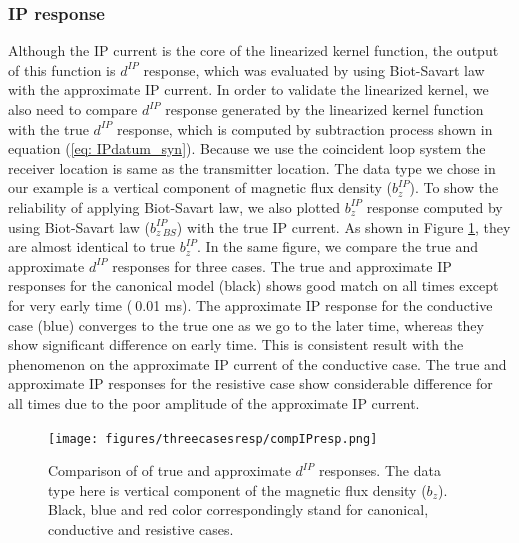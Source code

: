 \documentclass[a4paper, 11pt]{article}
\newcommand{\dip}{d^{IP}}
\begin{document}
\subsubsection{IP response}
Although the IP current is the core of the linearized kernel function, the output of this function is $\dip$ response, which was evaluated by using Biot-Savart law with the approximate IP current. In order to validate the linearized kernel, we also need to compare $\dip$ response generated by the linearized kernel function with the true $\dip$ response, which is computed by subtraction process shown in equation (\ref{eq: IPdatum_syn}). Because we use the coincident loop system the receiver location is same as the transmitter location. The data type we chose in our example is a vertical component of magnetic flux density ($b^{IP}_z$). To show the reliability of applying Biot-Savart law, we also plotted $b^{IP}_z$ response computed by using Biot-Savart law ($b^{IP}_{z \ BS}$) with the true IP current. As shown in Figure \ref{F:compIPresp}, they are almost identical to true $b^{IP}_z$. In the same figure, we compare the true and approximate $\dip$ responses for three cases. The true and approximate IP responses for the canonical model (black) shows good match on all times except for very early time ($~$0.01 ms). The approximate IP response for the conductive case (blue)  converges to the true one as we go to the later time, whereas they show significant difference on early time. This is consistent result with the phenomenon on the approximate IP current of the conductive case. The true and approximate IP responses for the resistive case show considerable difference for all times due to the poor amplitude of the approximate IP current. 

\begin{figure}[htb]
  \centering  \texttt{[image: figures/threecasesresp/compIPresp.png]}
  \caption{Comparison of of true and approximate $\dip$ responses. The data type here is vertical component of the magnetic flux density ($b_z$). Black, blue and red color correspondingly stand for canonical, conductive and resistive cases. }
  \label{F:compIPresp}
\end{figure}
\clearpage

\end{document}
